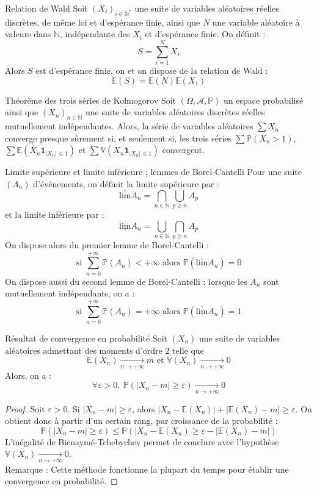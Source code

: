 \documentclass[french]{article}
\renewcommand{\P}{\mathbb{P}}
\newcommand{\N}{\mathbb{N}}
\newcommand{\st}{^*}
\newcommand{\E}{\mathbb{E}}
\newcommand{\V}{\mathbb{V}}
\theoremstyle{theorem}
\theoremstyle{definition}
\begin{document}
\begin{lem}{Relation de Wald}
	Soit $(X_i)_{i\in\N\st}$ une suite de variables aléatoires réelles discrètes, de même loi et d'espérance finie, ainsi que $N$ une variable aléatoire à valeurs dans $\N$, indépendante des $X_i$ et d'espérance finie. On définit : $$S=\sum_{i=1}^{N}X_i$$ Alors $S$ est d'espérance finie, on et on dispose de la relation de Wald : $$\E(S)=\E(N)\E(X_1)$$
\end{lem}

\begin{lem}{Théorème des trois séries de Kolmogorov}
	Soit $(\Omega,\mathcal{A},\P)$ un espace probabilisé ainsi que $(X_n)_{n\in\N}$ une suite de variables aléatoires discrètes réelles mutuellement indépendantes. Alors, la série de variables aléatoires $\sum X_n$ converge presque sûrement si, et seulement si, les trois séries $\sum \P(X_n >1)$, $\sum \E(X_n\mathbf{1}_{\lvert X_n\rvert\leqslant 1})$ et $\sum \V(X_n\mathbf{1}_{\lvert X_n\rvert\leqslant 1})$ convergent.
\end{lem}

\begin{lem}{Limite supérieure et limite inférieure ; lemmes de Borel-Cantelli} Pour une suite $(A_n)$ d'événements, on définit la limite supérieure par : $$\overline{\text{lim}}A_n=\bigcap_{n\in\N}\bigcup_{p\geqslant n}A_p$$ et la limite inférieure par : $$\underline{\text{lim}}A_n=\bigcup_{n\in\N}\bigcap_{p\geqslant n}A_p$$ On dispose alors du premier lemme de Borel-Cantelli : $$\text{si }\sum_{n=0}^{+\infty}\P(A_n)<+\infty\text{ alors }\P(\overline{\text{lim}}A_n)=0$$ On dispose aussi du second lemme de Borel-Cantelli : lorsque les $A_n$ sont mutuellement indépendants, on a : $$\text{si }\sum_{n=0}^{+\infty}\P(A_n)=+\infty\text{ alors }\P(\overline{\text{lim}}A_n)=1$$
\end{lem}

\begin{lem}{Résultat de convergence en probabilité} Soit $(X_n)$ une suite de variables aléatoires admettant des moments d'ordre $2$ telle que $$\E(X_n)\xrightarrow[n\to+\infty]{}m\text{  et  }\V(X_n)\xrightarrow[n\to+\infty]{}0$$ Alors, on a : $$\forall \varepsilon>0,\ \P(\lvert X_n-m\rvert\geqslant\varepsilon)\xrightarrow[n\to+\infty]{}0$$
\end{lem}
\begin{proof}Soit $\varepsilon>0$. Si $\lvert X_n-m\rvert\geqslant\varepsilon$, alors $\lvert X_n-\E(X_n)\rvert+\lvert\E(X_n)-m\rvert\geqslant\varepsilon$. On obtient donc à partir d'un certain rang, par croissance de la probabilité : $$\P(\lvert X_n-m\rvert\geqslant\varepsilon)\leqslant\P(\lvert X_n-\E(X_n)\geqslant\varepsilon -\lvert\E(X_n)-m\rvert)$$ L'inégalité de Bienaymé-Tchebychev permet de conclure avec l'hypothèse $\V(X_n)\xrightarrow[n\to+\infty]{}0$. \\ Remarque : Cette méthode fonctionne la plupart du temps pour établir une convergence en probabilité.
\end{proof}
\end{document}
